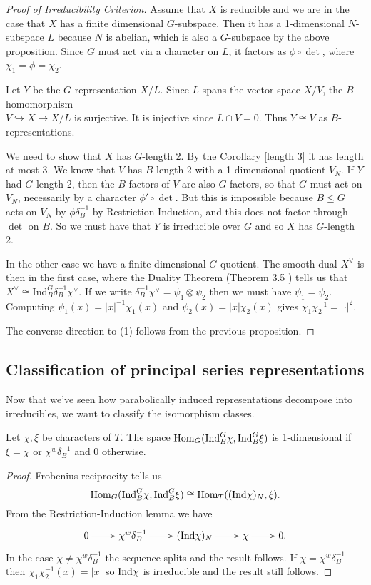 \begin{proof}[Proof of Irreducibility Criterion]
    Assume that $X$ is reducible and we are in the case that $X$ has a finite dimensional $G$-subspace. Then it has a 1-dimensional $N$-subspace $L$ because $N$ is abelian, which is also a $G$-subspace by the above proposition. Since $G$ must act via a character on $L$, it factors as $\phi \circ \det$, where $\chi_1=\phi=\chi_2$. 

    Let $Y$ be the $G$-representation $X/L$. Since $L$ spans the vector space $X/V$, the $B$-homomorphism \\${V \hookrightarrow X \to X/L}$ is surjective. It is injective since $L \cap V = 0$. Thus $Y \cong V$ as $B$-representations.

    We need to show that $X$ has $G$-length 2. By the Corollary \ref{length 3} it has length at most 3. We know that $V$ has $B$-length 2 with a 1-dimensional quotient $V_N$. If $Y$ had $G$-length 2, then the $B$-factors of $V$ are also $G$-factors, so that $G$ must act on $V_N$, necessarily by a character $\phi' \circ \det$. But this is impossible because $B \leq G$ acts on $V_N$ by $\phi \delta_B^{-1}$ by Restriction-Induction, and this does not factor through $\det$ on $B$. So we must have that $Y$ is irreducible over $G$ and so $X$ has $G$-length 2.

    In the other case we have a finite dimensional $G$-quotient. The smooth dual $X^\vee$ is then in the first case, where the Duality Theorem (Theorem 3.5 \cite{BH1}) tells us that $X^\vee \cong \mathrm{Ind}_B^G \delta_B^{-1} \chi^\vee$. If we write $\delta_B^{-1} \chi^\vee = \psi_1 \otimes \psi_2$ then we must have $\psi_1 = \psi_2$. Computing $\psi_1(x) = |x|^{-1} \chi_1(x)$ and $\psi_2(x) = |x| \chi_2(x)$ gives $\chi_1\chi_2^{-1} = |\cdot|^2$.

    The converse direction to (1) follows from the previous proposition.
\end{proof}


\subsection{Classification of principal series representations}


Now that we've seen how parabolically induced representations decompose into irreducibles, we want to classify the isomorphism classes.

\begin{prop}
    Let $\chi, \xi$ be characters of $T$. The space $\mathrm{Hom}_G(\mathrm{Ind}_B^G \chi, \mathrm{Ind}_B^G \xi)$ is 1-dimensional if $\xi = \chi$ or $\chi^w \delta_B^{-1}$ and 0 otherwise.
\end{prop}
\begin{proof}
    Frobenius reciprocity tells us
    $$\mathrm{Hom}_G(\mathrm{Ind}_B^G \chi, \mathrm{Ind}_B^G \xi) \cong \mathrm{Hom}_T((\mathrm{Ind} \chi)_N, \xi).$$
    From the Restriction-Induction lemma we have
    $$\xymatrix{0 \ar[r] & \chi^w \delta_B^{-1} \ar[r] & (\Ind \chi)_N \ar[r] & \chi \ar[r] & 0.}$$
    In the case $\chi \neq \chi^w \delta_B^{-1}$ the sequence splits and the result follows. If $\chi = \chi^w \delta_B^{-1}$ then $\chi_1\chi_2^{-1} (x) = |x|$ so $\mathrm{Ind} \chi$ is irreducible and the result still follows.
\end{proof}

